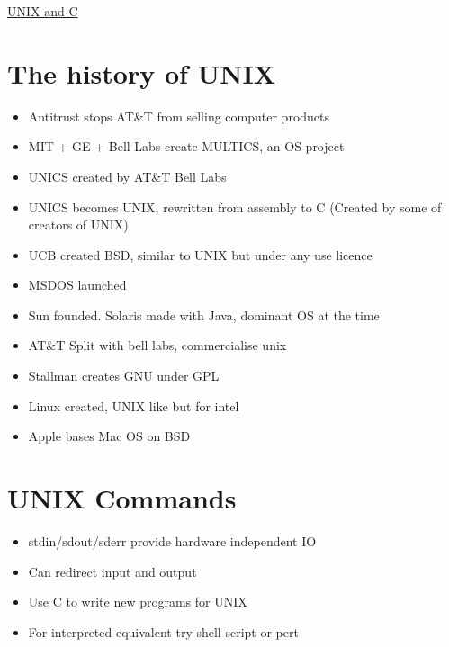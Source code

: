 \documentclass{article}[18pt]
\begin{document}
\begin{center}
\underline{\huge UNIX and C}
\end{center}
\section{The history of UNIX}
\begin{itemize}
\item Antitrust stops AT\&T from selling computer products
\item MIT + GE + Bell Labs create MULTICS, an OS project
\item UNICS created by AT\&T Bell Labs 
\item UNICS becomes UNIX, rewritten from assembly to C (Created by some of creators of UNIX)
\item UCB created BSD, similar to UNIX but under any use licence 
\item MSDOS launched
\item Sun founded. Solaris made with Java, dominant OS at the time
\item AT\&T Split with bell labs, commercialise unix
\item Stallman creates GNU under GPL
\item Linux created, UNIX like but for intel
\item Apple bases Mac OS on BSD
\end{itemize}
\section{UNIX Commands}
\begin{itemize}
\item stdin/sdout/sderr provide hardware independent IO
\item Can redirect input and output
\item Use C to write new programs for UNIX
\item For interpreted equivalent try shell script or pert
\end{itemize}
\end{document}
